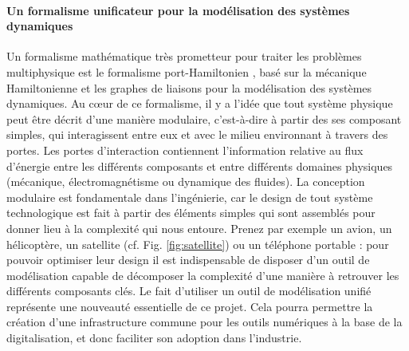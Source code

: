 \documentclass[12pt, french]{article}
\begin{document}
\paragraph{\large Un formalisme unificateur pour la modélisation des systèmes dynamiques\\}
Un formalisme mathématique très prometteur pour traiter les problèmes multiphysique est le formalisme port-Hamiltonien \cite{vanderSchaft2002}, basé sur la mécanique Hamiltonienne et les graphes de liaisons pour la modélisation des systèmes dynamiques. Au c\oe{}ur de ce formalisme, il y a l'idée que tout système physique peut être décrit d'une manière modulaire, c'est-à-dire à partir des ses composant simples, qui interagissent entre eux et avec le milieu environnant à travers des portes. Les portes d'interaction contiennent l'information relative au flux d'énergie entre les différents composants et entre différents domaines physiques (mécanique, électromagnétisme ou dynamique des fluides). La conception modulaire est fondamentale dans l'ingénierie, car le design de tout système technologique est fait à partir des éléments simples qui sont assemblés pour donner lieu à la complexité qui nous entoure. Prenez par exemple un avion, un hélicoptère, un satellite (cf. Fig. \ref{fig:satellite}) ou un téléphone portable : pour pouvoir optimiser leur design il est indispensable de disposer d'un outil de modélisation capable de décomposer la complexité d'une manière à retrouver les différents composants clés. Le fait d'utiliser un outil de modélisation unifié représente une nouveauté essentielle de ce projet. Cela pourra permettre la création d'une infrastructure commune pour les outils numériques à la base de la digitalisation, et donc faciliter son adoption dans l'industrie.
\end{document}
